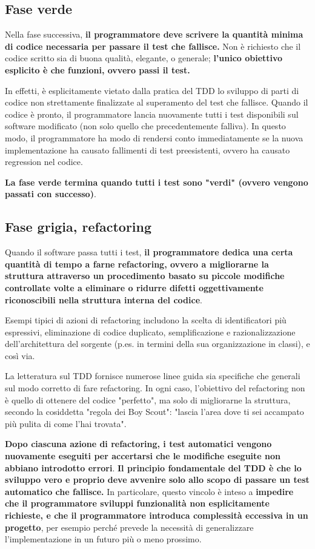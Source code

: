 \documentclass[11pt,a4paper]{book}
\begin{document}
\subsection{Fase verde}
Nella fase successiva, \textbf{il programmatore deve scrivere la quantità minima di codice necessaria per passare il test che fallisce.} Non è richiesto che il codice scritto sia di buona qualità, elegante, o generale; \textbf{l'unico obiettivo esplicito è che funzioni, ovvero passi il test.} 

In effetti, è esplicitamente vietato dalla pratica del TDD lo sviluppo di parti di codice non strettamente finalizzate al superamento del test che fallisce. Quando il codice è pronto, il programmatore lancia nuovamente tutti i test disponibili sul software modificato (non solo quello che precedentemente falliva). In questo modo, il programmatore ha modo di rendersi conto immediatamente se la nuova implementazione ha causato fallimenti di test preesistenti, ovvero ha causato regression nel codice. 

\textbf{La fase verde termina quando tutti i test sono "verdi" (ovvero vengono passati con successo)}.

\subsection{Fase grigia, refactoring}
Quando il software passa tutti i test, \textbf{il programmatore dedica una certa quantità di tempo a farne refactoring, ovvero a migliorarne la struttura attraverso un procedimento basato su piccole modifiche controllate volte a eliminare o ridurre difetti oggettivamente riconoscibili nella struttura interna del codice}. 

Esempi tipici di azioni di refactoring includono la scelta di identificatori più espressivi, eliminazione di codice duplicato, semplificazione e razionalizzazione dell'architettura del sorgente (p.es. in termini della sua organizzazione in classi), e così via. 

La letteratura sul TDD fornisce numerose linee guida sia specifiche che generali sul modo corretto di fare refactoring. In ogni caso, l'obiettivo del refactoring non è quello di ottenere del codice "perfetto", ma solo di migliorarne la struttura, secondo la cosiddetta "regola dei Boy Scout": "lascia l'area dove ti sei accampato più pulita di come l'hai trovata". 

\textbf{Dopo ciascuna azione di refactoring, i test automatici vengono nuovamente eseguiti per accertarsi che le modifiche eseguite non abbiano introdotto errori}.
\textbf{Il principio fondamentale del TDD è che lo sviluppo vero e proprio deve avvenire solo allo scopo di passare un test automatico che fallisce.} In particolare, questo vincolo è inteso a \textbf{impedire che il programmatore sviluppi funzionalità non esplicitamente richieste, e che il programmatore introduca complessità eccessiva in un progetto}, per esempio perché prevede la necessità di generalizzare l'implementazione in un futuro più o meno prossimo. 
\end{document}

